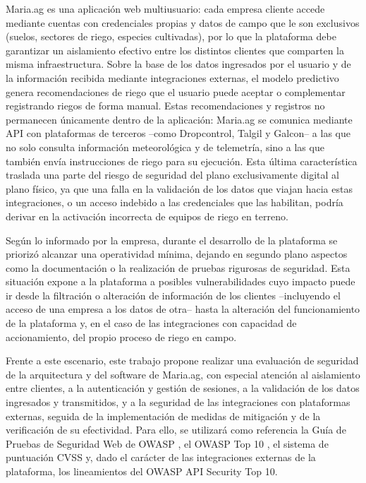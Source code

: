 \documentclass[12pt,letterpaper]{report}
\begin{document}
Maria.ag es una aplicación web multiusuario: cada empresa cliente accede
mediante cuentas con credenciales propias y datos de campo que le son
exclusivos (suelos, sectores de riego, especies cultivadas), por lo que la
plataforma debe garantizar un aislamiento efectivo entre los distintos
clientes que comparten la misma infraestructura. Sobre la base de los datos
ingresados por el usuario y de la información recibida mediante integraciones
externas, el modelo predictivo genera recomendaciones de riego que el usuario
puede aceptar o complementar registrando riegos de forma manual. Estas
recomendaciones y registros no permanecen únicamente dentro de la aplicación:
Maria.ag se comunica mediante API con plataformas de terceros --como
Dropcontrol, Talgil y Galcon-- a las que no solo consulta información
meteorológica y de telemetría, sino a las que también envía instrucciones de
riego para su ejecución. Esta última característica traslada una parte del
riesgo de seguridad del plano exclusivamente digital al plano físico, ya que
una falla en la validación de los datos que viajan hacia estas integraciones,
o un acceso indebido a las credenciales que las habilitan, podría derivar en
la activación incorrecta de equipos de riego en terreno.

Según lo informado por la empresa, durante el desarrollo de la plataforma se
priorizó alcanzar una operatividad mínima, dejando en segundo plano aspectos
como la documentación o la realización de pruebas rigurosas de seguridad.
Esta situación expone a la plataforma a posibles vulnerabilidades cuyo
impacto puede ir desde la filtración o alteración de información de los
clientes --incluyendo el acceso de una empresa a los datos de otra-- hasta la
alteración del funcionamiento de la plataforma y, en el caso de las
integraciones con capacidad de accionamiento, del propio proceso de riego en
campo.

Frente a este escenario, este trabajo propone realizar una evaluación de
seguridad de la arquitectura y del software de Maria.ag, con especial
atención al aislamiento entre clientes, a la autenticación y gestión de
sesiones, a la validación de los datos ingresados y transmitidos, y a la
seguridad de las integraciones con plataformas externas, seguida de la
implementación de medidas de mitigación y de la verificación de su
efectividad. Para ello, se utilizará como referencia la Guía de Pruebas de
Seguridad Web de OWASP \autocite{owasp2024wstg}, el OWASP Top 10
\autocite{owasp2025top10}, el sistema de puntuación CVSS
\autocite{first2023cvss} y, dado el carácter de las integraciones externas de
la plataforma, los lineamientos del OWASP API Security Top 10.
\end{document}

